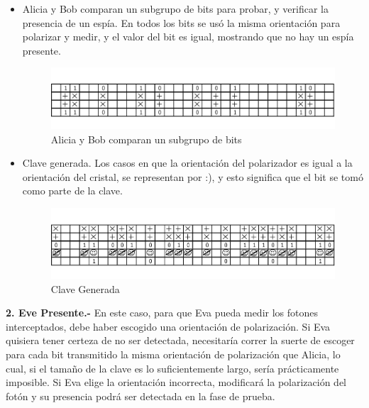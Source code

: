\documentclass[11pt, conference]{IEEEtran}
\begin{document}
\begin{itemize}
Alicia le dice a Bob (canal clasico) el valor de los bits que debió haber medido, y la verificación debe asegurar que los bits de Bob concuerdan al 100\% con los de Alicia.

La probabilidad de detectar un espía que esté presente es $1-\left(\frac{3}{4}\right)^{N}$.

\item Alicia y Bob comparan un subgrupo de bits para probar, y verificar la presencia de un espía. En todos los bits se usó la misma orientación para polarizar y medir, y el valor del bit es igual, mostrando que no hay un espía presente.

\begin{figure}[hbtp]
\centering
\includegraphics[scale=0.22]{5.png} 
\caption{Alicia y Bob comparan un subgrupo de bits}
\end{figure}

\item Clave generada. Los casos en que la orientación del polarizador es igual a la orientación del cristal, se representan por :), y esto significa que el bit se tomó como parte de la clave.

\begin{figure}[hbtp]
\centering
\includegraphics[scale=0.22]{6.png} 
\caption{Clave Generada}
\end{figure}

\end{itemize}

{\bf 2. Eve Presente.- } En este caso, para que Eva pueda medir los fotones interceptados, debe haber escogido una orientación de polarización. Si Eva quisiera tener certeza de no ser detectada, necesitaría correr la suerte de escoger para cada bit transmitido la misma orientación de polarización que Alicia, lo cual, si el tamaño de la clave es lo suficientemente largo, sería prácticamente imposible. Si Eva elige la orientación incorrecta, modificará la polarización del fotón y su presencia podrá ser detectada en la fase de prueba.
\end{document}
